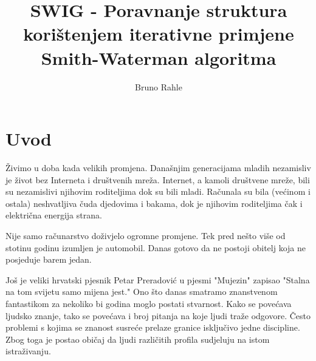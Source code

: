 \documentclass[times, utf8, zavrsni]{fer}
\begin{document}
%


\title{SWIG - Poravnanje struktura korištenjem iterativne primjene Smith-Waterman algoritma}

\author{Bruno Rahle}

\maketitle

\izvornik


\tableofcontents

\listoffigures

\listoftables

\chapter{Uvod}

Živimo u doba kada velikih promjena. Današnjim generacijama mladih nezamisliv
je život bez Interneta i društvenih mreža. Internet, a kamoli društvene mreže,
bili su nezamislivi njihovim roditeljima dok su bili mladi. Računala
su bila (većinom i ostala) neshvatljiva čuda djedovima i bakama, dok
je njihovim roditeljima čak i električna energija strana. 

Nije samo računarstvo doživjelo ogromne promjene. Tek pred nešto više od 
stotinu godinu izumljen je automobil. Danas gotovo da ne postoji obitelj
koja ne posjeduje barem jedan. 

Još je veliki hrvatski pjesnik Petar Preradović u pjesmi "Mujezin" %
zapisao "Stalna na tom svijetu samo mijena jest." Ono što danas smatramo
znanstvenom fantastikom za nekoliko bi godina moglo postati stvarnost. 
Kako se povećava ljudsko znanje, tako se povećava i broj pitanja na 
koje ljudi traže odgovore. Često problemi s kojima se znanost 
susreće prelaze granice isključivo jedne discipline. Zbog toga je postao
običaj da ljudi različitih profila sudjeluju na istom
istraživanju. 
\end{document}
